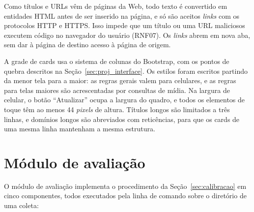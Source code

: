 Como títulos e URLs vêm de páginas da Web, todo texto é convertido em entidades
HTML antes de ser inserido na página, e só são aceitos \textit{links} com os
protocolos HTTP e HTTPS. Isso impede que um título ou uma URL maliciosos
executem código no navegador do usuário (RNF07). Os \textit{links} abrem em
nova aba, sem dar à página de destino acesso à página de origem.

A grade de cards usa o sistema de colunas do Bootstrap, com os pontos de quebra
descritos na Seção~\ref{sec:proj_interface}. Os estilos foram escritos
partindo da menor tela para a maior: as regras gerais valem para celulares, e
as regras para telas maiores são acrescentadas por consultas de mídia. Na
largura de celular, o botão ``Atualizar'' ocupa a largura do quadro, e todos os
elementos de toque têm ao menos 44 \textit{pixels} de altura. Títulos longos
são limitados a três linhas, e domínios longos são abreviados com reticências,
para que os cards de uma mesma linha mantenham a mesma estrutura.

\section{Módulo de avaliação}
\label{sec:impl_avaliacao}

O módulo de avaliação implementa o procedimento da
Seção~\ref{sec:calibracao} em cinco componentes, todos executados pela linha de
comando sobre o diretório de uma coleta:

